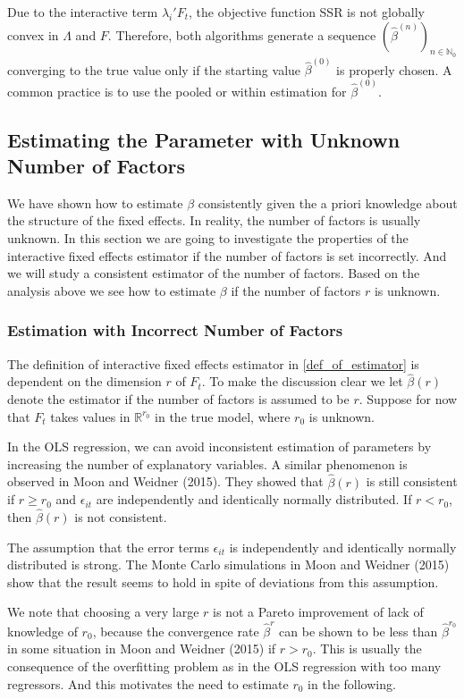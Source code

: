 \documentclass[a4paper]{article}
\newcommand{\IR}[0]{\mathbb{R}}
\newcommand{\IN}[0]{\mathbb{N}}
\begin{document}
Due to the interactive term $\lambda_i'F_t$, the objective function SSR is not globally convex in $\Lambda$ and $F$. Therefore, both algorithms generate a sequence $(\hat \beta^{(n)})_{n \in \IN_0}$ converging to the true value only if the starting value $\hat \beta^{(0)}$ is properly chosen. A common practice is to use the pooled or within estimation for $\hat \beta^{(0)}$.

\subsection{Estimating the Parameter with Unknown Number of Factors}
We have shown how to estimate $\beta$ consistently given the a priori knowledge about the structure of the fixed effects. In reality, the number of factors is usually unknown. In this section we are going to investigate the properties of the interactive fixed effects estimator if the number of factors is set incorrectly. And we will study a consistent estimator of the number of factors. Based on the analysis above we see how to estimate $\beta$ if the number of factors $r$ is unknown.

\subsubsection{Estimation with Incorrect Number of Factors}

The definition of interactive fixed effects estimator in \eqref{def_of_estimator} is dependent on the dimension $r$ of $F_t$. To make the discussion clear we let $\hat \beta(r)$ denote the estimator if the number of factors is assumed to be $r$. Suppose for now that $F_t$ takes values in $\IR^{r_0}$ in the true model, where $r_0$ is unknown.

In the OLS regression, we can avoid inconsistent estimation of parameters by increasing the number of explanatory variables. A similar phenomenon is observed in Moon and Weidner (2015). They showed that $\hat \beta(r)$ is still consistent if $r\geq r_0$ and $\epsilon_{it}$ are independently and identically normally distributed. If $r<r_0$, then $\hat \beta(r)$ is not consistent.


The assumption that the error terms $\epsilon_{it}$ is independently and identically normally distributed is strong. The Monte Carlo simulations in Moon and Weidner (2015) show that the result seems to hold in spite of deviations from this assumption.

 We note that choosing a very large $r$ is not a Pareto improvement  of lack of knowledge of $r_0$, because the convergence rate $\hat \beta^r$ can be shown to be less than $\hat \beta^{r_0}$ in some situation in Moon and Weidner (2015) if $r>r_0$. This is usually the consequence of the overfitting problem as in the OLS regression with too many regressors. And this motivates the need to estimate $r_0$ in the following.
\end{document}
